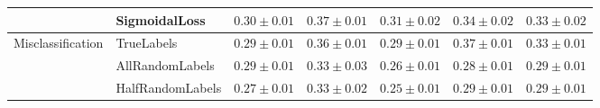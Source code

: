 \begin{table}[t]
{\begin{tabular}{l|l|llll|l}
                                                                                      & SigmoidalLoss                                                       & \multicolumn{1}{l}{$0.30\pm0.01$}                                                                       & \multicolumn{1}{l}{$0.37\pm0.01$}                                                           & \multicolumn{1}{l}{$0.31\pm0.02$}                                                                              & \multicolumn{1}{l|}{$0.34\pm0.02$}                                                                      & $\mathbf{0.33\pm0.02}$                                                                                                 \\ \hline
\multirow{4}{*}{Misclassification}                                                    & TrueLabels                                                      & $0.29\pm0.01$                                                                                           & $0.36\pm0.01$                                                                               & $0.29\pm0.01$                                                                                                  & $0.37\pm0.01$                                                                                           & $\mathbf{0.33\pm0.01}$                                                                                                 \\
                                                                                      & AllRandomLabels                                                     & $0.29\pm0.01$                                                                                           & $0.33\pm0.03$                                                                               & $0.26\pm0.01$                                                                                                  & $0.28\pm0.01$                                                                                           & $0.29\pm0.01$                                                                                                          \\
                                                                                      & HalfRandomLabels                                                    & $0.27\pm0.01$                                                                                           & $0.33\pm0.02$                                                                               & $0.25\pm0.01$                                                                                                  & $0.29\pm0.01$                                                                                           & $0.29\pm0.01$                                                                                                          \\

\end{tabular}}
\end{table}
